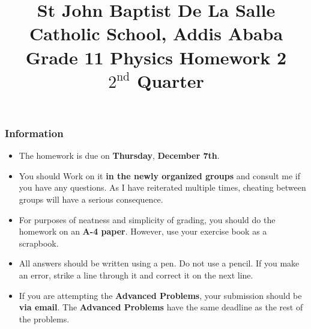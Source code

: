 \documentclass[12pt,addpoints]{exam}
\begin{document}
	\title{St John Baptist De La Salle Catholic School, Addis Ababa\\
		\large Grade 11 Physics Homework 2\\
		$2^\text{nd}$ Quarter}
	\maketitle
	\begin{center}
		\subsubsection*{Information}
		\begin{itemize}
			\item The homework is due on \textbf{Thursday}, \textbf{December 7th}.
			\item You should Work on it \textbf{in the newly organized groups} and consult me if you have any questions. As I have reiterated multiple times, cheating between groups will have a serious consequence.
			\item For purposes of neatness and simplicity of grading, you should do the homework on an \textbf{A-4 paper}. However, use your exercise book as a scrapbook.
			\item All answers should be written using a pen. Do not use a pencil. If you make an error, strike a line through it and correct it on the next line.
			\item If you are attempting the \textbf{Advanced Problems}, your submission should be \textbf{via email}. The \textbf{Advanced Problems }have the same deadline as the rest of the problems. 
		\end{itemize}
	\end{center}
	\newpage
\end{document}
